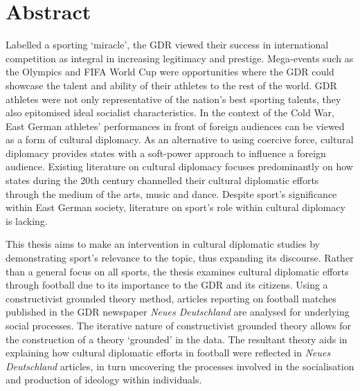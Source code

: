 

\chapter*{Abstract}

Labelled a sporting ‘miracle’, the GDR viewed their success in international competition as integral in increasing legitimacy and prestige. Mega-events such as the Olympics and FIFA World Cup were opportunities where the GDR could showcase the talent and ability of their athletes to the rest of the world. GDR athletes were not only representative of the nation’s best sporting talents, they also epitomised ideal socialist characteristics. In the context of the Cold War, East German athletes’ performances in front of foreign audiences can be viewed as a form of cultural diplomacy. As an alternative to using coercive force, cultural diplomacy provides states with a soft-power approach to influence a foreign audience. Existing literature on cultural diplomacy focuses predominantly on how states during the 20th century channelled their cultural diplomatic efforts through the medium of the arts, music and dance. Despite sport’s significance within East German society, literature on sport’s role within cultural diplomacy is lacking. 

This thesis aims to make an intervention in cultural diplomatic studies by demonstrating sport’s relevance to the topic, thus expanding its discourse. Rather than a general focus on all sports, the thesis examines cultural diplomatic efforts through football due to its importance to the GDR and its citizens. Using a constructivist grounded theory method, articles reporting on football matches published in the GDR newspaper \textit{Neues Deutschland} are analysed for underlying social processes. The iterative nature of constructivist grounded theory allows for the construction of a theory ‘grounded’ in the data. The resultant theory aids in explaining how cultural diplomatic efforts in football were reflected in \textit{Neues Deutschland} articles, in turn uncovering the processes involved in the socialisation and production of ideology within individuals.
